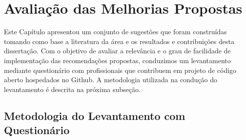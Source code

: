 



\section{Avaliação das Melhorias Propostas}
\label{sec:sug_melhoria_avaliacao_das_melhorias}

Este Capítulo apresentou um conjunto de sugestões que foram construídas tomando
como base a literatura da área e os resultados e contribuições desta
dissertação. Com o objetivo de avaliar a relevância e o grau de facilidade de
implementação das recomendações propostas, conduzimos um levantamento mediante
questionário com profissionais que contribuem em projeto de código aberto
hospedados no Github. A metodologia utilizada na condução do levantamento é
descrita na próxima subseção.

\subsection{Metodologia do Levantamento com Questionário}
\label{sub:sug_melhoria_metodologia_levantamento}

